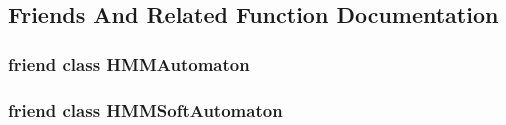 \subsection{Friends And Related Function Documentation}
\hypertarget{class_soft_state_a3f73063e67c75773ba856636249277b6}{
\subsubsection[{H\+M\+M\+Automaton}]{\setlength{\rightskip}{0pt plus 5cm}friend class {\bf H\+M\+M\+Automaton}\hspace{0.3cm}{\ttfamily [friend]}}}\label{class_soft_state_a3f73063e67c75773ba856636249277b6}
\hypertarget{class_soft_state_aa4adce0967898598e6f24f2024c247a3}{
\subsubsection[{H\+M\+M\+Soft\+Automaton}]{\setlength{\rightskip}{0pt plus 5cm}friend class {\bf H\+M\+M\+Soft\+Automaton}\hspace{0.3cm}{\ttfamily [friend]}}}\label{class_soft_state_aa4adce0967898598e6f24f2024c247a3}


